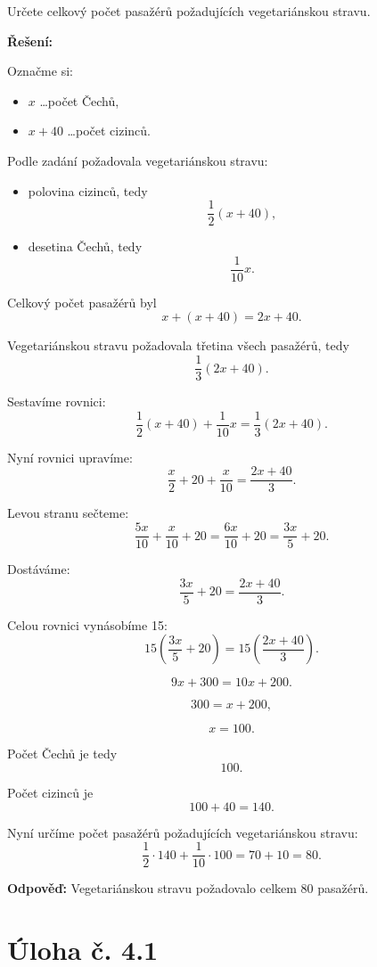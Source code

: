 \documentclass[12pt,a4paper]{article}
\begin{document}
Určete celkový počet pasažérů požadujících vegetariánskou stravu.

\bigskip

\textbf{Řešení:}

Označme si:
\begin{itemize}
    \item \(x\) \dots počet Čechů,
    \item \(x+40\) \dots počet cizinců.
\end{itemize}

Podle zadání požadovala vegetariánskou stravu:
\begin{itemize}
    \item polovina cizinců, tedy
    \[
    \frac{1}{2}(x+40),
    \]
    \item desetina Čechů, tedy
    \[
    \frac{1}{10}x.
    \]
\end{itemize}

Celkový počet pasažérů byl
\[
x+(x+40)=2x+40.
\]

Vegetariánskou stravu požadovala třetina všech pasažérů, tedy
\[
\frac{1}{3}(2x+40).
\]

Sestavíme rovnici:
\[
\frac{1}{2}(x+40)+\frac{1}{10}x=\frac{1}{3}(2x+40).
\]

Nyní rovnici upravíme:
\[
\frac{x}{2}+20+\frac{x}{10}=\frac{2x+40}{3}.
\]

Levou stranu sečteme:
\[
\frac{5x}{10}+\frac{x}{10}+20=\frac{6x}{10}+20=\frac{3x}{5}+20.
\]

Dostáváme:
\[
\frac{3x}{5}+20=\frac{2x+40}{3}.
\]

Celou rovnici vynásobíme 15:
\[
15\left(\frac{3x}{5}+20\right)=15\left(\frac{2x+40}{3}\right).
\]

\[
9x+300=10x+200.
\]

\[
300=x+200,
\]

\[
x=100.
\]

Počet Čechů je tedy
\[
100.
\]

Počet cizinců je
\[
100+40=140.
\]

Nyní určíme počet pasažérů požadujících vegetariánskou stravu:
\[
\frac{1}{2}\cdot 140+\frac{1}{10}\cdot 100=70+10=80.
\]

\bigskip

\textbf{Odpověď:}  
Vegetariánskou stravu požadovalo celkem 80 pasažérů.


\newpage
\section*{Úloha č. 4.1}
\end{document}
